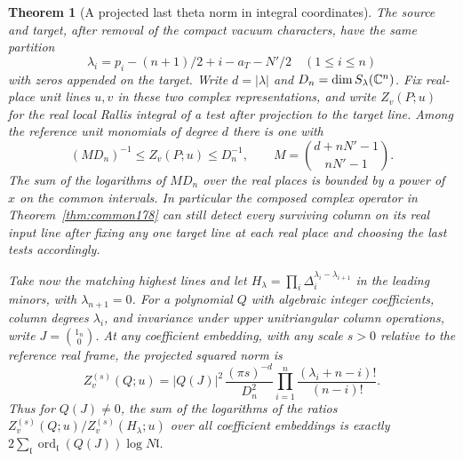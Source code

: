 \documentclass[a4paper,11pt]{article}
\newtheorem{theorem}[proposition]{Theorem}
\theoremstyle{definition}
\theoremstyle{remark}
\numberwithin{equation}{section}
\begin{document}
\begin{theorem}[A projected last theta norm in integral coordinates]
\label{thm:last182}
The source and target, after removal of the compact vacuum
characters, have the same partition
\[
       \lambda_i=p_i-(n+1)/2+i-a_T-N'/2 \quad(1\le i\le n)
\]
with zeros appended on the target. Write \(d=|\lambda|\) and
\(D_n=\dim S_\lambda(\mathbb C^n)\). Fix real-place unit lines
\(u,v\) in these two complex representations, and write
\(Z_v(P;u)\) for the real local Rallis integral of a test
after projection to the target line. Among the reference
unit monomials of degree \(d\) there is one with
\[
   (M D_n)^{-1}\le Z_v(P;u)\le D_n^{-1},\qquad
             M=\binom{d+nN'-1}{nN'-1}.
\]
The sum of the logarithms of \(MD_n\) over the real
places is bounded by a power of \(x\) on the common
intervals. In particular the composed complex operator in
Theorem~\ref{thm:common178} can still detect every surviving
column on its real input line after fixing any one target
line at each real place and choosing the last tests accordingly.

Take now the matching highest lines and let
\(H_\lambda=\prod_i\Delta_i^{\lambda_i-\lambda_{i+1}}\)
in the leading minors, with \(\lambda_{n+1}=0\).
For a polynomial \(Q\) with algebraic integer coefficients,
column degrees \(\lambda_i\), and invariance under upper
unitriangular column operations, write \(J=\binom{1_n}0\).
At any coefficient embedding, with any scale \(s>0\) relative
to the reference real frame, the projected squared norm is
\begin{equation}
 Z_v^{(s)}(Q;u)
   = |Q(J)|^2\,
     \frac{(\pi s)^{-d}}{D_n^2}
            \prod_{i=1}^n\frac{(\lambda_i+n-i)!}{(n-i)!}.
                                                        \label{eq:last182}
\end{equation}
Thus for \(Q(J)\ne0\), the sum of the logarithms of the
ratios \(Z_v^{(s)}(Q;u)/Z_v^{(s)}(H_\lambda;u)\)
over all coefficient embeddings is exactly
\(2\sum_{\mathfrak l}\operatorname{ord}_{\mathfrak l}(Q(J))
\log N\mathfrak l\).
\end{theorem}
\end{document}
